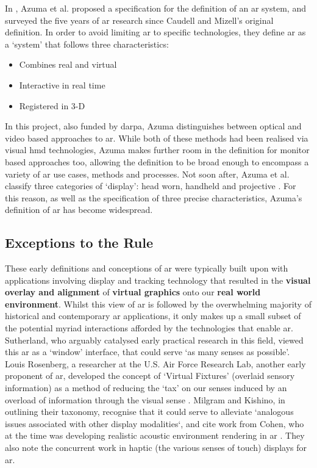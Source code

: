 In \citeyear{azuma1997}, Azuma et al. proposed a specification for the definition of an \gls{ar} system, and surveyed the five years of \gls{ar} research since Caudell and Mizell's original definition. In order to avoid limiting \gls{ar} to specific technologies, they define \gls{ar} as a `system' that follows three characteristics: 

\begin{itemize}
    \item Combines real and virtual
    \item Interactive in real time
    \item Registered in 3-D
\end{itemize}

In this project, also funded by \gls{darpa}, Azuma distinguishes between optical and video based approaches to \gls{ar}. While both of these methods had been realised via visual \gls{hmd} technologies, Azuma makes further room in the definition for monitor based approaches too, allowing the definition to be broad enough to encompass a variety of \gls{ar} use cases, methods and processes. Not soon after, Azuma et al. classify three categories of `display': head worn, handheld and projective \citeyearpar{azuma2001}. For this reason, as well as the specification of three precise characteristics, Azuma's definition of \gls{ar} has become widespread. 

\subsection{Exceptions to the Rule}\label{sec: review-history-exceptions}
These early definitions and conceptions of \gls{ar} were typically built upon with applications involving display and tracking technology that resulted in the \textbf{visual overlay and alignment} of \textbf{virtual graphics} onto our \textbf{real world environment}. Whilst this view of \gls{ar} is followed by the overwhelming majority of historical and contemporary \gls{ar} applications, it only makes up a small subset of the potential myriad interactions afforded by the technologies that enable \gls{ar}. Sutherland, who arguably catalysed early practical research in this field, viewed this \gls{ar} as a `window' interface, that could serve `as many senses as possible'. Louis Rosenberg, a researcher at the U.S. Air Force Research Lab, another early proponent of \gls{ar}, developed the concept of `Virtual Fixtures' (overlaid sensory information) as a method of reducing the `tax' on our senses induced by an overload of information through the visual sense \citep{rosenberg1993}. Milgram and Kishino, in outlining their taxonomy, recognise that it could serve to alleviate `analogous issues associated with other display modalities`, and cite work from Cohen, who at the time was developing realistic acoustic environment rendering in \gls{ar} \citeyearpar{cohen1993}. They also note the concurrent work in haptic (the various senses of touch) displays for \gls{ar}. 

